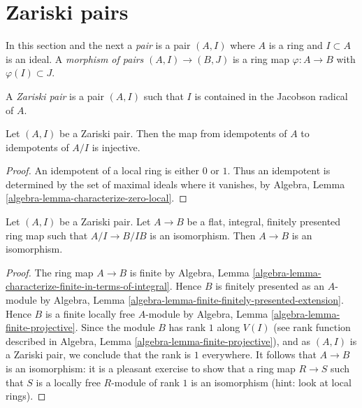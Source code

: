 \section{Zariski pairs}
\label{section-zariski-pairs}

\noindent
In this section and the next a {\it pair} is a pair $(A, I)$ where $A$
is a ring and $I \subset A$ is an ideal. A {\it morphism of pairs}
$(A, I) \to (B, J)$ is a ring map $\varphi : A \to B$ with
$\varphi(I) \subset J$.

\begin{definition}
\label{definition-zariski-pair}
A {\it Zariski pair} is a pair $(A, I)$ such that
$I$ is contained in the Jacobson radical of $A$.
\end{definition}

\begin{lemma}
\label{lemma-idempotents-determined-modulo-radical}
Let $(A, I)$ be a Zariski pair. Then the map from
idempotents of $A$ to idempotents of $A/I$ is injective.
\end{lemma}

\begin{proof}
An idempotent of a local ring is either $0$ or $1$.
Thus an idempotent is determined by the set of maximal ideals
where it vanishes, by
Algebra, Lemma \ref{algebra-lemma-characterize-zero-local}.
\end{proof}

\begin{lemma}
\label{lemma-check-isomorphism-zariski}
Let $(A, I)$ be a Zariski pair. Let $A \to B$ be a flat,
integral, finitely presented ring map such that $A/I \to B/IB$
is an isomorphism. Then $A \to B$ is an isomorphism.
\end{lemma}

\begin{proof}
The ring map $A \to B$ is finite by
Algebra, Lemma \ref{algebra-lemma-characterize-finite-in-terms-of-integral}.
Hence $B$ is finitely presented as an $A$-module by
Algebra, Lemma \ref{algebra-lemma-finite-finitely-presented-extension}.
Hence $B$ is a finite locally free $A$-module by
Algebra, Lemma \ref{algebra-lemma-finite-projective}.
Since the module $B$ has rank $1$
along $V(I)$ (see rank function described in
Algebra, Lemma \ref{algebra-lemma-finite-projective}),
and as $(A, I)$ is a Zariski pair, we conclude that the
rank is $1$ everywhere.
It follows that $A \to B$ is an isomorphism:
it is a pleasant exercise to show that
a ring map $R \to S$ such that $S$ is a locally free $R$-module
of rank $1$ is an isomorphism (hint: look at local rings).
\end{proof}


